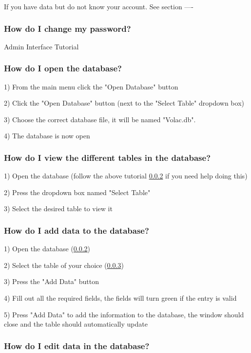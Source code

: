 If you have data but do not know your account. See section ----

\subsubsection{How do I change my password?}



Admin Interface Tutorial

\subsubsection{How do I open the database?}\label{opendb}

1) From the main menu click the "Open Database" button

2) Click the "Open Database"  button (next to the "Select Table" dropdown box)

3) Choose the correct database file, it will be named "Volac.db". 

4) The database is now open

\subsubsection{How do I view the different tables in the database?}\label{viewdb}

1) Open the database (follow the above tutorial \ref{opendb} if you need help doing this)

2) Press the dropdown box named "Select Table" 

3) Select the desired table to view it

\subsubsection{How do I add data to the database?}\label{adddata}

1) Open the database (\ref{opendb})

2) Select the table of your choice (\ref{viewdb})

3) Press the "Add Data" button

4) Fill out all the required fields, the fields will turn green if the entry is valid

5) Press "Add Data" to add the information to the database, the window should close and the table should automatically update

\subsubsection{How do I edit data in the database?}

